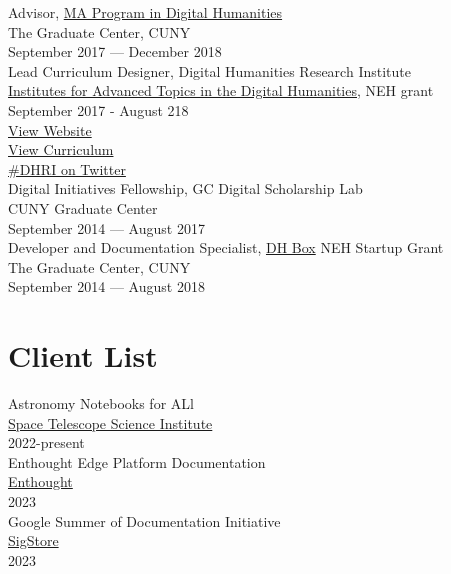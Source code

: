 \documentclass[11pt]{article}
\begin{document}
Advisor, \href{https://gc.cuny.edu/Page-Elements/Academics-Research-Centers-Initiatives/Masters-Programs/Digital-Humanities}{MA Program in Digital Humanities}\\
The Graduate Center, CUNY\\
September 2017 — December 2018\\

Lead Curriculum Designer, Digital Humanities Research Institute\\
\href{https://www.neh.gov/grants/odh/institutes-advanced-topics-in-the-digital-humanities}{Institutes for Advanced Topics in the Digital Humanities}, NEH grant\\
September 2017 - August 218\\
\href{http://dhinstitutes.org}{View Website}\\
\href{https://github.com/DHRI-Curriculum}{View Curriculum}\\
\href{https://twitter.com/search?q=\%2523dhri&src=tyah}{\#DHRI on Twitter}\\

Digital Initiatives Fellowship, GC Digital Scholarship Lab\\
CUNY Graduate Center\\
September 2014 — August 2017\\

Developer and Documentation Specialist, \href{https://dhbox.org/}{DH Box} NEH Startup Grant\\
The Graduate Center, CUNY\\
September 2014 — August 2018\\

\section*{Client List}
\label{sec:orgheadline2}
Astronomy Notebooks for ALl\\
\href{https://www.stsci.edu/}{Space Telescope Science Institute}\\
2022-present\\

Enthought Edge Platform Documentation\\
\href{https://www.enthought.com/}{Enthought}\\
2023\\

Google Summer of Documentation Initiative\\
\href{https://www.sigstore.dev/}{SigStore}\\
2023\\
\end{document}

